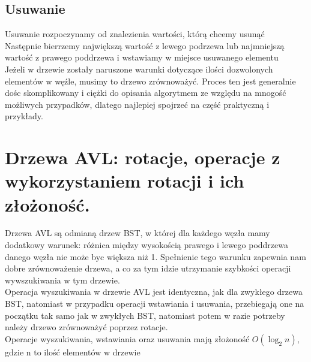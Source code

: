 \documentclass[12pt]{article}
\begin{document}
    \subsection{Usuwanie}
    Usuwanie rozpoczynamy od znalezienia wartości, którą chcemy usunąć \\
    \noindent Następnie bierrzemy największą wartość z lewego podrzewa lub najmniejszą wartość z prawego poddrzewa i wstawiamy w miejsce usuwanego elementu \\
    \noindent Jeżeli w drzewie zostały naruszone warunki dotyczące ilości dozwolonych elementów w węźle, musimy to drzewo zrównoważyć. Proces ten jest generalnie dośc skomplikowany i ciężki do opisania algorytmem ze względu na mnogość możliwych przypadków, dlatego najlepiej spojrzeć na część praktyczną i przykłady.

    \newpage


    \section{Drzewa AVL: rotacje, operacje z wykorzystaniem rotacji i ich złożoność.}
    Drzewa AVL są odmianą drzew BST, w której dla każdego węzła mamy dodatkowy warunek: różnica między wysokością prawego i lewego poddrzewa danego węzła nie może byc większa niż 1.
    Spełnienie tego warunku zapewnia nam dobre zrównoważenie drzewa, a co za tym idzie utrzymanie szybkości operacji wywszukiwania w tym drzewie.\\

    \noindent Operacja wyszukiwania w drzewie AVL jest identyczna, jak dla zwykłego drzewa BST, natomiast w przypadku operacji wstawiania i usuwania, przebiegają one na początku tak samo jak w zwykłych BST, natomiast potem w razie potrzeby należy drzewo zrównoważyć poprzez rotacje. \\

    \noindent Operacje wyszukiwania, wstawiania oraz usuwania mają złożoność $O(\log_{2} n)$, gdzie n to ilość elementów w drzewie
\end{document}
